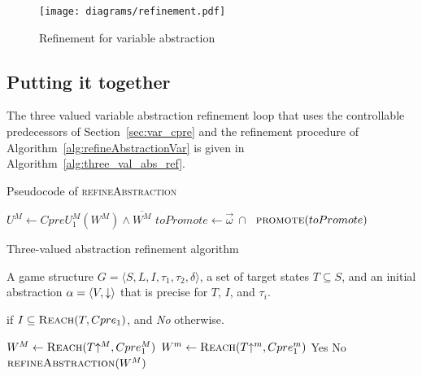 \begin{figure}[t]
\centering
\texttt{[image: diagrams/refinement.pdf]}
\caption{Refinement for variable abstraction}
\label{fig:var_refinement}
\end{figure}

\subsection{Putting it together}
The three valued variable abstraction refinement loop that uses the controllable predecessors of Section~\ref{sec:var_cpre} and the refinement procedure of Algorithm~\ref{alg:refineAbstractionVar} is given in Algorithm~\ref{alg:three_val_abs_ref}.

\begin{algorithm}

\caption{Pseudocode of \textsc{refineAbstraction}}
\label{alg:refineAbstractionVar}

\begin{algorithmic}[1]
    \State $U^M \gets CpreU_1^M(W^M) \land \overline{W^M}$
    \State $toPromote \gets \vec{\omega}~\cap~$ \label{a:ra:extract_prime}
    \State $\Call{promote}{toPromote}$ \label{a:ra:promote}
\EndFunction
\end{algorithmic}
\end{algorithm}

\begin{algorithm}
\caption{Three-valued abstraction refinement algorithm}
\label{alg:three_val_abs_ref}

\begin{algorithmic}[1]

\Require A game structure $G = \langle S, L, I, \tau_1, \tau_2, \delta \rangle$, a set 
of target states $T\subseteq S$, and an initial abstraction $\alpha=\langle V, \mathord{\downarrow} \rangle$
that is precise for $T$, $I$, and $\tau_i$.

 if $I \subseteq \textsc{Reach}(T, Cpre_1)$, and {\it No} otherwise.


    \Loop
        \State $W^M \gets \textsc{Reach}(T\mathord{\uparrow^M}, Cpre_1^M)$ \label{a:varabs:must}
        \State $W^m \gets \textsc{Reach}(T\mathord{\uparrow^m}, Cpre_1^m)$ \label{a:varabs:may}
            \State\Return Yes \label{a:varabs:yes}
            \State\Return No \label{a:varabs:no}
        \Else       
            \State$\Call{refineAbstraction}{W^M}$ \label{a:varabs:ref}
        \EndIf
    \EndLoop
\EndFunction

\end{algorithmic}
\end{algorithm}


